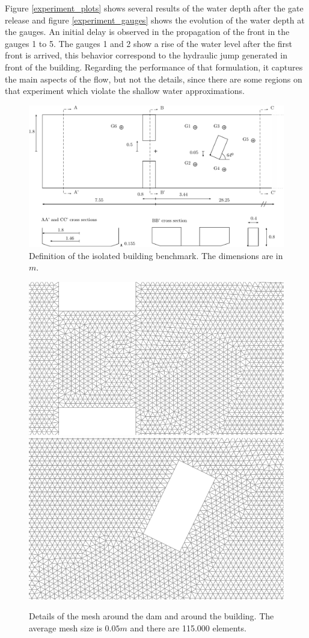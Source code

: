 \documentclass[a4paper,12pt]{article}
\begin{document}
Figure \ref{experiment_plots} shows several results of the water depth after the gate release and figure \ref{experiment_gauges} shows the evolution of the water depth at the gauges. An initial delay is observed in the propagation of the front in the gauges 1 to 5.
The gauges 1 and 2 show a rise of the water level after the first front is arrived, this behavior correspond to the hydraulic jump generated in front of the building.
Regarding the performance of that formulation, it captures the main aspects of the flow, but not the details, since there are some regions on that experiment which violate the shallow water approximations.

\begin{figure}[H]
\centering
\includegraphics[width=\textwidth]{img/exp/sketch.pdf}
\caption{Definition of the isolated building benchmark. The dimensions are in $m$.}
\label{experiment_sketch}
\end{figure}


\begin{figure}[H]
\centering
\includegraphics[width=.49\textwidth]{img/exp/mesh_dam.png}
\hfill
\includegraphics[width=.47\textwidth]{img/exp/mesh_building.png}
\caption{Details of the mesh around the dam and around the building. The average mesh size is $0.05m$ and there are 115.000 elements.}
\label{experiment_mesh}
\end{figure}
\end{document}
